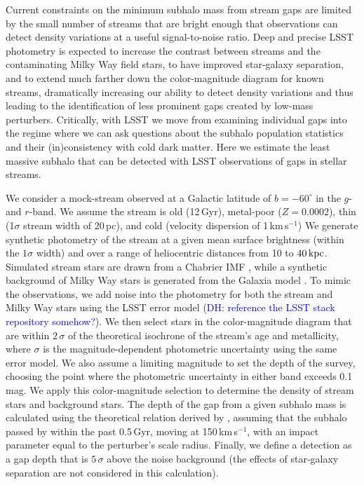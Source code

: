 \documentclass[modern,linenumbers]{aastex62}
\newcommand{\Comment}[3]{\textcolor{#1}{(#2: #3)}}
\newcommand{\DAH}[1]{\Comment{blue}{DH}{#1}} %
\begin{document}
Current constraints on the minimum subhalo mass from stream gaps are limited by the small number of streams that are bright enough that observations can detect density variations at a useful signal-to-noise ratio. Deep and precise LSST photometry is expected to increase the contrast between streams and the contaminating Milky Way field stars, to have improved star-galaxy separation, and to extend much farther down the color-magnitude diagram for known streams, dramatically increasing our ability to detect density variations and thus leading to the identification of less prominent gaps created by low-mass perturbers. Critically, with LSST we move from examining individual gaps into the regime where we can ask questions about the subhalo population statistics and their (in)consistency with cold dark matter.
Here we estimate the least massive subhalo that can be detected with LSST observations of gaps in stellar streams.

We consider a mock-stream observed at a Galactic latitude of $b=-60^\circ$ in the $g$- and $r$-band. We assume the stream is old (12\,Gyr), metal-poor ($Z = 0.0002$), thin (1$\sigma$ stream width of 20\,pc), and cold (velocity dispersion of 1\,km\,s$^{-1}$) We generate synthetic photometry of the stream at a given mean surface brightness (within the $1\sigma$ width) and over a range of heliocentric distances from 10 to $40\mathrm{\,kpc}$.  Simulated stream stars are drawn from a Chabrier IMF \citep{2003PASP..115..763C}, while a synthetic background of Milky Way stars is generated from the Galaxia model \citep{sharma2011}. To mimic the observations, we add noise into the photometry for both the stream and Milky Way stars using the LSST error model \DAH{reference the LSST stack repository somehow?}. We then select stars in the color-magnitude diagram that are within $2\,\sigma$ of the theoretical isochrone of the stream's age and metallicity, where $\sigma$ is the magnitude-dependent photometric uncertainty using the same error model. 
We also assume a limiting magnitude to set the depth of the survey, choosing the point where the photometric uncertainty in either band exceeds 0.1 mag. We apply this color-magnitude selection to determine the density of stream stars and background stars.
The depth of the gap from a given subhalo mass is calculated using the theoretical relation derived by \citet{erkal2016}, assuming that the subhalo passed by within the past 0.5\,Gyr, moving at 150\,km\,s$^{-1}$, with an impact parameter equal to the perturber's scale radius. Finally, we define a detection as a gap depth that is $5\,\sigma$ above the noise background (the effects of star-galaxy separation are not considered in this calculation).
\end{document}
